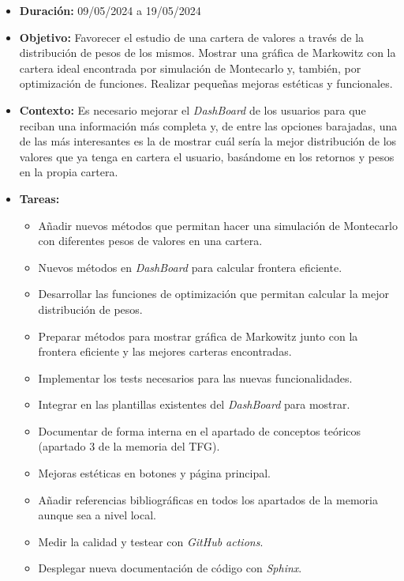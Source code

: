 \begin{itemize}
\item  
\textbf{Duración:} 09/05/2024 a 19/05/2024

\item
\textbf{Objetivo:} Favorecer el estudio de una cartera de valores a través de la distribución de pesos de los mismos. Mostrar una gráfica de Markowitz con la cartera ideal encontrada por simulación de Montecarlo y, también, por optimización de funciones. Realizar pequeñas mejoras estéticas y funcionales. 


\item
\textbf{Contexto:} Es necesario mejorar el \emph{DashBoard} de los usuarios para que reciban una información más completa y, de entre las opciones barajadas, una de las más interesantes es la de mostrar cuál sería la mejor distribución de los valores que ya tenga en cartera el usuario, basándome en los retornos y pesos en la propia cartera. 


\item
\textbf{Tareas:}
	\begin{itemize}
	\tightlist
	\item 
	Añadir nuevos métodos que permitan hacer una simulación de Montecarlo con diferentes pesos de valores en una cartera. 
	\item
	Nuevos métodos en \emph{DashBoard} para calcular frontera eficiente. 
	\item
	Desarrollar las funciones de optimización que permitan calcular la mejor distribución de pesos.
	\item
	Preparar métodos para mostrar gráfica de Markowitz junto con la frontera eficiente y las mejores carteras encontradas. 
	\item
	Implementar los tests necesarios para las nuevas funcionalidades. 
	\item
	Integrar en las plantillas existentes del \emph{DashBoard} para mostrar. 
	\item
	Documentar de forma interna en el apartado de conceptos teóricos (apartado 3 de la memoria del TFG). 
	\item
	Mejoras estéticas en botones y página principal. 
	\item
	Añadir referencias bibliográficas en todos los apartados de la memoria aunque sea a nivel local. 
	\item
	Medir la calidad y testear con \emph{GitHub actions}. 
	\item
	Desplegar nueva documentación de código con \emph{Sphinx}. 
  	\end{itemize}
\end{itemize}



